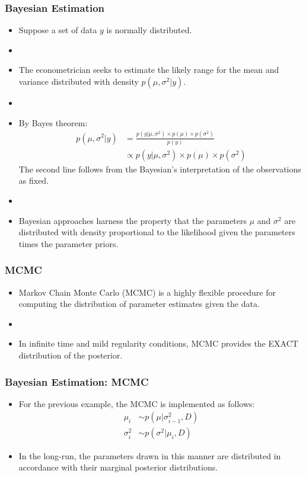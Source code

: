 \documentclass[10pt, compress]{beamer}
\begin{document}
\begin{frame}[fragile]
\frametitle{Bayesian Estimation}
\begin{itemize}
    \item Suppose a set of data $y$ is normally distributed.
    \item []
    \item The econometrician seeks to estimate the likely range for the mean and variance distributed with density $p(\mu,\sigma^2|y)$.
    \item []
    \item By Bayes theorem:
    \begin{align*}
        p(\mu,\sigma^2|y) &= \frac{p(y|\mu,\sigma^2) \times p(\mu) \times p(\sigma^2)}{p(y)}\\
        &\propto p(y|\mu,\sigma^2) \times p(\mu) \times p(\sigma^2)
    \end{align*}
    The second line follows from the Bayesian's interpretation of the observations as fixed.
    \item[]
    \item Bayesian approaches harness the property that the parameters $\mu$ and $\sigma^2$ are distributed with density proportional to the likelihood given the parameters times the parameter priors.
\end{itemize}
\end{frame}

\begin{frame}[fragile]
\frametitle{MCMC}
\begin{itemize}
    \item Markov Chain Monte Carlo (MCMC) is a highly flexible procedure for computing the distribution of parameter estimates given the data.
    \item []
    \item In infinite time and mild regularity conditions, MCMC provides the EXACT distribution of the posterior.
\end{itemize}
\end{frame}

\begin{frame}[fragile]
\frametitle{Bayesian Estimation: MCMC}
\begin{itemize}
    \item For the previous example, the MCMC is implemented as follows:
    \begin{align}
        \mu_i &\sim p\left(\mu | \sigma^2_{i-1},D\right)\\
        \sigma^2_i &\sim p\left(\sigma^2 | \mu_i,D\right)
    \end{align}
    \item In the long-run, the parameters drawn in this manner are distributed in accordance with their marginal posterior distributions.
\end{itemize}
\end{frame}
\end{document}

